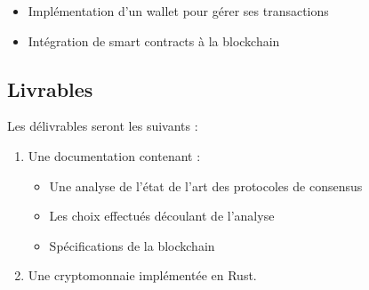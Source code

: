 \documentclass[../tb_report.tex]{subfiles}
\begin{document}
\begin{itemize}
    \item Implémentation d'un wallet pour gérer ses transactions
    \item Intégration de smart contracts à la blockchain
\end{itemize}

\subsection*{Livrables}
Les délivrables seront les suivants :
\begin{enumerate}
    \item Une documentation contenant :
    	\begin{itemize}
        	\item Une analyse de l'état de l'art des protocoles de consensus
        	\item Les choix effectués découlant de l'analyse
        	\item Spécifications de la blockchain
    	\end{itemize}
    \item Une cryptomonnaie implémentée en Rust.
\end{enumerate}
\end{document}
